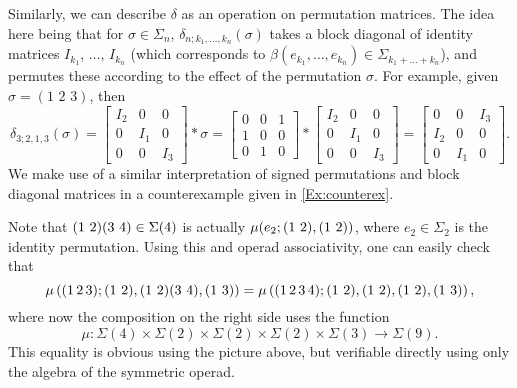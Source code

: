\begin{example}
\begin{remark}
Similarly, we can describe $\delta$ as an operation on permutation matrices. The idea here being that for $\sigma \in \Sigma_n$, $\delta_{n;k_1,\ldots,k_n}(\sigma)$ takes a block diagonal of identity matrices $I_{k_1}$, $\ldots$, $I_{k_n}$ (which corresponds to $\beta(e_{k_1},\ldots,e_{k_n}) \in \Sigma_{k_1+\ldots+k_n}$), and permutes these according to the effect of the permutation $\sigma$. For example, given $\sigma = (1 \,\, 2 \,\, 3)$, then
  \[
    \delta_{3;2,1,3}(\sigma) =
    \begin{bmatrix}
    I_2 & 0 & 0 \\
    0 & I_1 & 0 \\
    0 & 0 & I_3
    \end{bmatrix}
    \ast
    \sigma
    =
      \begin{bmatrix}
      0 & 0 & 1 \\
      1 & 0 & 0 \\
      0 & 1 & 0
      \end{bmatrix}
    \ast
    \begin{bmatrix}
    I_2 & 0 & 0 \\
    0 & I_1 & 0 \\
    0 & 0 & I_3
    \end{bmatrix}
    =
    \begin{bmatrix}
    0 & 0 & I_3 \\
    I_2 & 0 & 0 \\
    0 & I_1 & 0
    \end{bmatrix}.
  \]
We make use of a similar interpretation of signed permutations and block diagonal matrices in a counterexample given in \cref{Ex:counterex}.
\end{remark}

  
Note that $( 1 \, \, 2 )( 3 \, \, 4 ) \in \Sigma(4)$ is actually $\mu(e_{2}; ( 1 \, \, 2 ), ( 1 \, \, 2 ))$, where $e_{2} \in \Sigma_{2}$ is the identity permutation. Using this and operad associativity, one can easily check that
  \[
    \mu \left( (1 \, 2 \, 3); ( 1 \, \, 2 ), ( 1 \, \, 2 )( 3 \, \, 4 ), ( 1 \, \, 3 ) \right) = \mu \left( (1 \, 2 \, 3 \, 4); ( 1 \, \, 2 ), ( 1 \, \, 2 ), ( 1 \, \, 2 ), ( 1 \, \, 3 ) \right),
  \]
where now the composition on the right side uses the function
  \[
    \mu \colon \Sigma(4) \times \Sigma(2) \times \Sigma(2) \times \Sigma(2) \times \Sigma(3) \rightarrow \Sigma(9).
  \]
This equality is obvious using the picture above, but verifiable directly using only the algebra of the symmetric operad.
\end{example}

